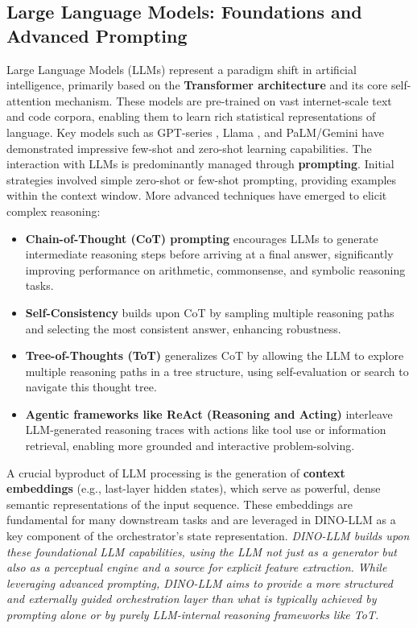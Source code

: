 \documentclass[11pt]{article}
\begin{document}
\subsection{Large Language Models: Foundations and Advanced Prompting}
\label{sec:rw_llms}
Large Language Models (LLMs) represent a paradigm shift in artificial intelligence, primarily based on the \textbf{Transformer architecture} \citep{Vaswani2017AttentionIA} and its core self-attention mechanism. These models are pre-trained on vast internet-scale text and code corpora, enabling them to learn rich statistical representations of language. Key models such as GPT-series \citep{Brown2020LanguageMA}, Llama \citep{Touvron2023LlamaOA}, and PaLM/Gemini \citep{Chowdhery2022PaLMSM, Anil2023GeminiAF} have demonstrated impressive few-shot and zero-shot learning capabilities.
The interaction with LLMs is predominantly managed through \textbf{prompting}. Initial strategies involved simple zero-shot or few-shot prompting, providing examples within the context window. More advanced techniques have emerged to elicit complex reasoning:
\begin{itemize}
    \item \textbf{Chain-of-Thought (CoT) prompting} \citep{Wei2022ChainOT} encourages LLMs to generate intermediate reasoning steps before arriving at a final answer, significantly improving performance on arithmetic, commonsense, and symbolic reasoning tasks.
    \item \textbf{Self-Consistency} \citep{Wang2022SelfConsistencyIC} builds upon CoT by sampling multiple reasoning paths and selecting the most consistent answer, enhancing robustness.
    \item \textbf{Tree-of-Thoughts (ToT)} \citep{Yao2023TreeOT} generalizes CoT by allowing the LLM to explore multiple reasoning paths in a tree structure, using self-evaluation or search to navigate this thought tree.
    \item \textbf{Agentic frameworks like ReAct (Reasoning and Acting)} \citep{Yao2022ReActSL} interleave LLM-generated reasoning traces with actions like tool use or information retrieval, enabling more grounded and interactive problem-solving.
\end{itemize}
A crucial byproduct of LLM processing is the generation of \textbf{context embeddings} (e.g., last-layer hidden states), which serve as powerful, dense semantic representations of the input sequence. These embeddings are fundamental for many downstream tasks and are leveraged in DINO-LLM as a key component of the orchestrator's state representation.
\textit{DINO-LLM builds upon these foundational LLM capabilities, using the LLM not just as a generator but also as a perceptual engine and a source for explicit feature extraction. While leveraging advanced prompting, DINO-LLM aims to provide a more structured and externally guided orchestration layer than what is typically achieved by prompting alone or by purely LLM-internal reasoning frameworks like ToT.}
\end{document}
